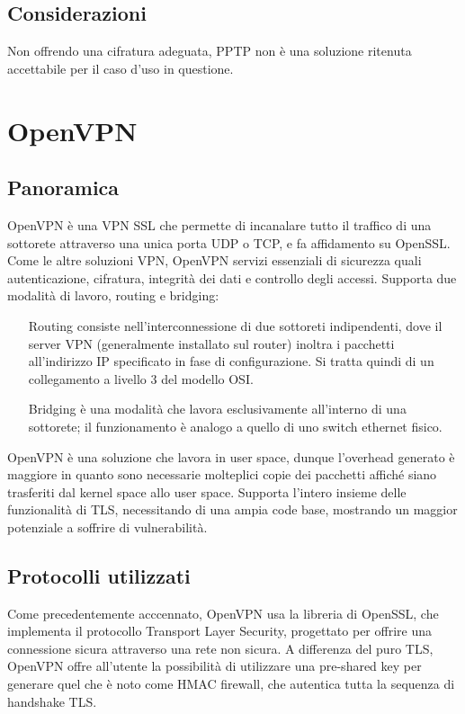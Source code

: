 \subsection{Considerazioni}
Non offrendo una cifratura adeguata, PPTP non è una soluzione ritenuta accettabile per il caso d'uso in questione.

\section{OpenVPN}
\subsection{Panoramica}
OpenVPN è una VPN SSL che permette di incanalare tutto il traffico di una sottorete attraverso una unica porta UDP o TCP, e fa affidamento su OpenSSL. Come le altre soluzioni VPN, OpenVPN servizi essenziali di sicurezza quali autenticazione, cifratura, integrità dei dati e controllo degli accessi.
Supporta due modalità di lavoro, routing e bridging:
\begin{itemize}
    \item[Routing] consiste nell'interconnessione di due sottoreti indipendenti, dove il server VPN (generalmente installato sul router) inoltra i pacchetti all'indirizzo IP specificato in fase di configurazione. Si tratta quindi di un collegamento a livello 3 del modello OSI.
    \item[Bridging] è una modalità che lavora esclusivamente all'interno di una sottorete; il funzionamento è analogo a quello di uno switch ethernet fisico.
\end{itemize}

OpenVPN è una soluzione che lavora in user space, dunque l'overhead generato è maggiore in quanto sono necessarie molteplici copie dei pacchetti affiché siano trasferiti dal kernel space allo user space. Supporta l'intero insieme delle funzionalità di TLS, necessitando di una ampia code base, mostrando un maggior potenziale a soffrire di vulnerabilità.

\subsection{Protocolli utilizzati}
Come precedentemente acccennato, OpenVPN usa la libreria di OpenSSL, che implementa il protocollo Transport Layer Security, progettato per offrire una connessione sicura attraverso una rete non sicura.
A differenza del puro TLS, OpenVPN offre all'utente la possibilità di utilizzare una pre-shared key per generare quel che è noto come HMAC firewall, che autentica tutta la sequenza di handshake TLS.

